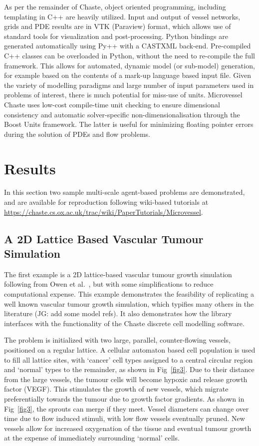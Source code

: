 \documentclass[10pt,letterpaper]{article}
\begin{document}
As per the remainder of Chaste, object oriented programming, including templating in C++ are heavily utilized. Input and output of vessel networks, grids and PDE results are in VTK (Paraview) format, which allows use of standard tools for visualization and post-processing. Python bindings are generated automatically using Py++ with a CASTXML back-end. Pre-compiled C++ classes can be overloaded in Python, without the need to re-compile the full framework. This allows for automated, dynamic model (or sub-model) generation, for example based on the contents of a mark-up language based input file. Given the variety of modelling paradigms and large number of input parameters used in problems of interest, there is much potential for miss-use of units. Microvessel Chaste uses low-cost compile-time unit checking to ensure dimensional consistency and automatic solver-specific non-dimensionalisation through the Boost Units framework. The latter is useful for minimizing floating pointer errors during the solution of PDEs and flow problems.

\section*{Results}

In this section two sample multi-scale agent-based problems are demonstrated, and are available for reproduction following wiki-based tutorials at \url{https://chaste.cs.ox.ac.uk/trac/wiki/PaperTutorials/Microvessel}.

\subsection*{A 2D Lattice Based Vascular Tumour Simulation}

The first example is a 2D lattice-based vascular tumour growth simulation following from Owen et al.~\cite{Owen2011}, but with some simplifications to reduce computational expense. This example demonstrates the feasibility of replicating a well known vascular tumour growth simulation, which typifies many others in the literature (JG: add some model refs). It also demonstrates how the library interfaces with the functionality of the Chaste discrete cell modelling software.

The problem is initialized with two large, parallel, counter-flowing vessels, positioned on a regular lattice. A cellular automaton based cell population is used to fill all lattice sites, with `cancer' cell types assigned to a central circular region and `normal' types to the remainder, as shown in Fig~\ref{fig3}. Due to their distance from the large vessels, the tumour cells will become hypoxic and release growth factor (VEGF). This stimulates the growth of new vessels, which migrate preferentially towards the tumour due to growth factor gradients. As shown in Fig~\ref{fig3}, the sprouts can merge if they meet. Vessel diameters can change over time due to flow induced stimuli, with low flow vessels eventually pruned. New vessels allow for increased oxygenation of the tissue and eventual tumour growth at the expense of immediately surrounding `normal' cells.
\end{document}
